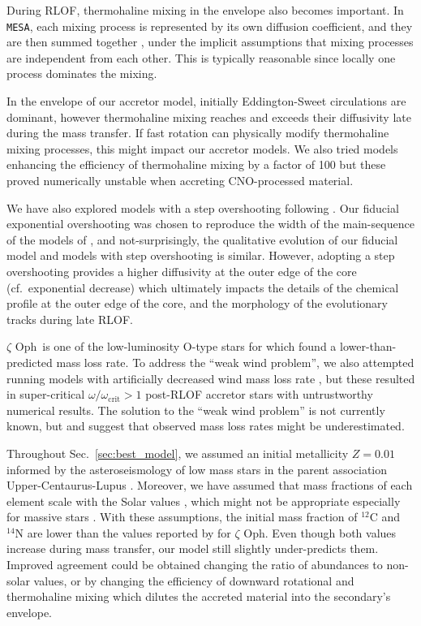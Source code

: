\documentclass[twocolumn,twocolappendix,trackchanges]{aastex63}
\newcommand{\code}[1]{\texttt{#1}}
\newcommand{\MESA}{\code{MESA}}
\DeclareRobustCommand{\Secref}[1]{Sec.~\ref{#1}}
\newcommand{\zoph}{$\zeta$ Oph}
\begin{document}
During RLOF, thermohaline mixing in the envelope also becomes
important. In \MESA, each mixing process is represented by its own
diffusion coefficient, and they are then summed together
\citep[e.g.,][]{paxton:11}, under the implicit assumptions that mixing
processes are independent from each other. This is typically
reasonable since locally one process dominates the mixing.

In the envelope of our accretor model, initially Eddington-Sweet circulations are
dominant, however thermohaline mixing reaches and exceeds their
diffusivity late during the mass transfer. If fast rotation can
physically modify thermohaline mixing processes, this might impact our
accretor models.  We also tried models enhancing the efficiency of
thermohaline mixing by a factor of 100 \citep{schootemeijer:19} but
these proved numerically unstable when accreting CNO-processed material.

We have also explored models with a step overshooting following
\cite{brott:11}. Our fiducial exponential overshooting was chosen to
reproduce the width of the main-sequence of the models of
\cite{brott:11}, and not-surprisingly, the qualitative evolution of
our fiducial model and models with step overshooting is
similar. However, adopting a step overshooting provides a higher
diffusivity at the outer edge of the core (cf.\ exponential decrease) which ultimately impacts the
details of the chemical profile at the outer edge of the core, and the
morphology of the evolutionary tracks during late RLOF.

\zoph\ is one of the low-luminosity O-type stars for which
\cite{marcolino:09} found a lower-than-predicted mass loss rate.
To address the ``weak wind problem'', we also attempted
running models with artificially decreased wind mass loss rate
\citep[e.g.,][]{renzo:17}, but these resulted in super-critical
$\omega/\omega_\mathrm{crit}>1$ post-RLOF accretor stars with untrustworthy
numerical results. The solution to the ``weak wind problem'' is not
currently known, but \cite{lucy:12} and \cite{lagae:21} suggest that
observed mass loss rates might be underestimated.

Throughout \Secref{sec:best_model}, we assumed an initial
metallicity $Z=0.01$ informed by the asteroseismology of low mass
stars in the parent association Upper-Centaurus-Lupus
\citep[e.g.,][]{murphy:21}. Moreover, we have assumed that mass
fractions of each element scale with the Solar values
\citep{grevesse:98}, which might not be appropriate especially for
massive stars \citep[e.g.,][]{grasha:21}. With these assumptions, the
initial mass fraction of $^{12}\mathrm{C}$ and $^{14}\mathrm{N}$ are
lower than the values reported by
 for \zoph. Even though both values increase
during mass transfer, our model still slightly under-predicts
them. Improved agreement could be obtained changing the ratio of
abundances to non-solar values, or by changing the efficiency of
downward rotational and thermohaline mixing which dilutes the accreted
material into the secondary's envelope.
\end{document}

